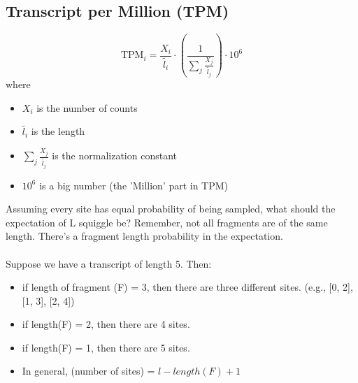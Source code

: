 \documentclass[10pt]{article}
\begin{document}
\subsection*{Transcript per Million (TPM)}
\[\text{TPM}_i = \frac{X_i}{\tilde{l_i}} \cdot \left(\frac{1}{\sum_j \frac{X_j}{\tilde{l_j}}}\right) \cdot 10^6\]
where 
\begin{itemize}
    \item $X_i$ is the number of counts
    \item $\tilde{l_i}$ is the length
    \item $\sum_j \frac{X_j}{\tilde{l_j}}$ is the normalization constant
    \item $10^6$ is a big number (the 'Million' part in TPM)
\end{itemize}
Assuming every site has equal probability of being sampled, what should the expectation of L squiggle be?  Remember, not all fragments are of the same length.  There's a fragment length probability in the expectation.\\\\
Suppose we have a transcript of length 5.  Then:
\begin{itemize}
    \item if length of fragment (F) = 3, then there are three different sites.  (e.g., [0, 2], [1, 3], [2, 4])
    \item if length(F) = 2, then there are 4 sites.
    \item if length(F) = 1, then there are 5 sites.
    \item In general, (number of sites) = $l - length(F) + 1$
\end{itemize}
\end{document}
